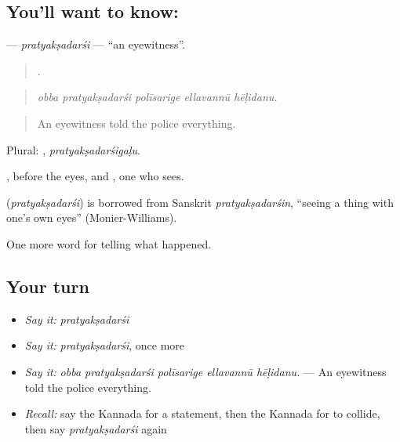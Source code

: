 \subsection*{You'll want to know: }
\textbf{} — \emph{pratyakṣadarśi} — \textquotedblleft{}an eyewitness\textquotedblright{}.

\begin{quote}
    .
\end{quote}

\begin{quote}
\emph{obba pratyakṣadarśi polīsarige ellavannū hēḷidanu.}
\end{quote}

\begin{quote}
An eyewitness told the police everything.
\end{quote}

Plural: , \emph{pratyakṣadarśigaḷu}.

, before the eyes, and , one who sees.

\begin{cousinweb}
\textbf{} (\emph{pratyakṣadarśi}) is borrowed from Sanskrit \emph{pratyakṣadarśin}, \textquotedblleft{}seeing a thing with one's own eyes\textquotedblright{} (Monier-Williams).
\end{cousinweb}

\begin{grammarlens}[title={What you've built}]
One more word for telling what happened.
\end{grammarlens}

\subsection*{Your turn}
\begin{itemize}
\raggedright
  \item \emph{Say it:} \emph{pratyakṣadarśi}
  \item \emph{Say it:} \emph{pratyakṣadarśi}, once more
  \item \emph{Say it:} \emph{obba pratyakṣadarśi polīsarige ellavannū hēḷidanu.} — An eyewitness told the police everything.
  \item \emph{Recall:} say the Kannada for a statement, then the Kannada for to collide, then say \emph{pratyakṣadarśi} again
\end{itemize}

